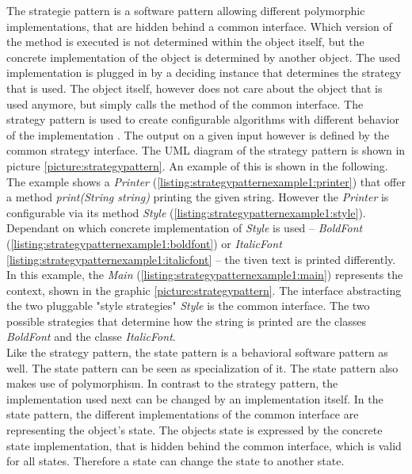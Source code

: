 The strategie pattern is a software pattern allowing different polymorphic implementations, that are hidden behind a common interface. Which version of the method is executed is not determined within the object itself, but the concrete implementation of the object is determined by another object. The used implementation is plugged in by a deciding instance that determines the strategy that is used. The object itself, however does not care about the object that is used anymore, but simply calls the method of the common interface. The strategy pattern is used to create configurable algorithms with different behavior of the implementation \cite[p. 349]{gof}. The output on a given input however is defined by the common strategy interface. The \ac{UML} diagram of the strategy pattern is shown in picture \ref{picture:strategypattern}. An example of this is shown in the following.
\\

The example shows a \textit{Printer} (\ref{listing:strategypatternexample1:printer}) that offer a method \textit{print(String string)} printing the given string. However the \textit{Printer} is configurable via its method \textit{Style} (\ref{listing:strategypatternexample1:style}). Dependant on which concrete implementation of \textit{Style} is used -- \textit{BoldFont} (\ref{listing:strategypatternexample1:boldfont}) or \textit{ItalicFont} \ref{listing:strategypatternexample1:italicfont} -- the tiven text is printed differently. In this example, the \textit{Main} (\ref{listing:strategypatternexample1:main}) represents the context, shown in the graphic \ref{picture:strategypattern}. The interface abstracting the two pluggable "style strategies" \textit{Style} is the common interface. The two possible strategies that determine how the string is printed are the classes \textit{BoldFont} and the classe \textit{ItalicFont}.
\\

Like the strategy pattern, the state pattern is a behavioral software pattern as well. The state pattern can be seen as specialization of it. The state pattern also makes use of polymorphism. In contrast to the strategy pattern, the implementation used next can be changed by an implementation itself. In the state pattern, the different implementations of the common interface are representing the object's state. The objects state is expressed by the concrete state implementation, that is hidden behind the common interface, which is valid for all states. Therefore a state can change the state to another state.
\\

